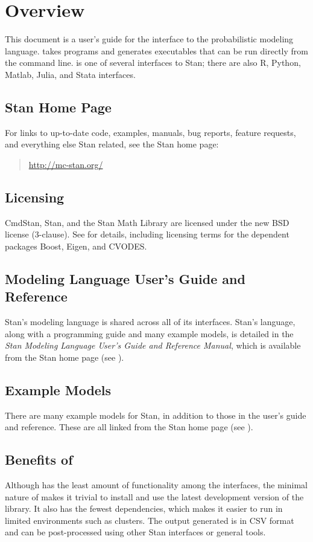 \chapter{Overview}

\noindent
This document is a user's guide for the \CmdStan interface to the
\Stan probabilistic modeling language. \CmdStan takes \Stan programs
and generates executables that can be run directly from the command
line. \CmdStan is one of several interfaces to Stan; there are also R,
Python, Matlab, Julia, and Stata interfaces.

\section{Stan Home Page}\label{home-page.section}

For links to up-to-date code, examples, manuals, bug reports, feature
requests, and everything else Stan related, see the Stan home page:
%
\begin{quote}
\url{http://mc-stan.org/}
\end{quote}


\section{Licensing}

CmdStan, Stan, and the Stan Math Library are licensed under the new
BSD license (3-clause).  See  for details,
including licensing terms for the dependent packages Boost, Eigen, and
CVODES.


\section{Modeling Language User's Guide and Reference}

Stan's modeling language is shared across all of its interfaces.
Stan's language, along with a programming guide and many example
models, is detailed in the {\it Stan Modeling Language User's Guide
  and Reference Manual}, which is available from the Stan home page
(see ).

\section{Example Models}

There are many example models for Stan, in addition to those in the
user's guide and reference. These are all linked from the Stan home
page (see ).


\section{Benefits of \CmdStan}

Although \CmdStan has the least amount of functionality among the
\Stan interfaces, the minimal nature of \CmdStan makes it trivial to
install and use the latest development version of the \Stan
library. It also has the fewest dependencies, which makes it easier to
run in limited environments such as clusters. The output generated is
in CSV format and can be post-processed using other Stan interfaces or
general tools.
